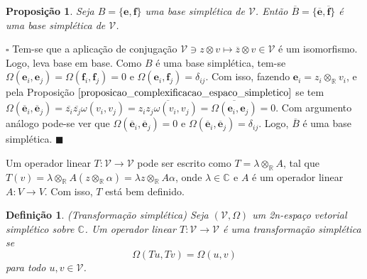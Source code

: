\documentclass[12pt]{book}
\newtheorem{definicao}[teorema]{Definição}
\newtheorem{proposicao}[teorema]{Proposição}
\newenvironment{prova}[1]{$\square$ #1}{\hfill$\blacksquare$}
\newcommand{\complexificado}[1]{\mathcal{#1}}
\newcommand{\complexificacaoelemento}[2]{#1\otimes_{\reta} #2}
\newcommand{\complexo}[1]{\mathbb{C}^{#1}}
\newcommand{\formaSimpletica}[2]{\omega(#1, #2)}
\newcommand{\formaSimpleticaExtendida}[2]{\Omega(#1, #2)}
\newcommand{\real}[1]{\mathbb{R}^{#1}}
\newcommand{\reta}{\real{}}
\begin{document}
	\begin{proposicao}\label{proposicao_base_simpletica_conjugada}
		Seja $B=\{\textbf{e}, \textbf{f} \}$ uma base simplética de $\complexificado{V}$. Então $\overline{B}=\{\overline{\textbf{e}}, \overline{\textbf{f}}\}$ é uma base simplética de $\complexificado{V}$.
	\end{proposicao}
	\begin{prova}
		Tem-se que a aplicação de conjugação $\complexificado{V} \ni z\otimes v \mapsto \overline{z}\otimes v \in \complexificado{V}$ é um isomorfismo. Logo, leva base em base. Como $B$ é uma base simplética, tem-se $\Omega(\textbf{e}_{i}, \textbf{e}_{j}) = \Omega(\textbf{f}_{i}, \textbf{f}_{j}) =0$ e $\Omega(\textbf{e}_{i}, \textbf{f}_{j}) = \delta_{ij}$. Com isso, fazendo $\textbf{e}_{i} = \complexificacaoelemento{z_{i}}{v_{i}}$, e pela Proposição $\ref{proposicao_complexificacao_espaco_simpletico}$ se tem $\Omega(\overline{\textbf{e}}_{i}, \overline{\textbf{e}}_{j}) =	\overline{z_{i}}\overline{z_{j}}\formaSimpletica{v_{i}}{v_{j}}=\overline{z_{i}z_{j}\formaSimpletica{v_{i}}{v_{j}}} = \overline{\Omega(\textbf{e}_{i}, \textbf{e}_{j})} = 0$. Com argumento análogo pode-se ver que $\Omega(\overline{\textbf{e}}_{i}, \overline{\textbf{e}}_{j}) =0$ e $\Omega(\overline{\textbf{e}}_{i}, \overline{\textbf{e}}_{j}) =\delta_{ij}$. Logo, $\overline{B}$ é uma base simplética.
	\end{prova}
	
	Um operador linear $T : \complexificado{V} \to \complexificado{V}$ pode ser escrito como $T=\complexificacaoelemento{\lambda}{A}$, tal que $T(v) = \complexificacaoelemento{\lambda}{A}(\complexificacaoelemento{z}{\alpha}) = \complexificacaoelemento{\lambda z}{A\alpha}$, onde $\lambda \in \complexo{}$ e $A$ é um operador linear $A:V \to V$. Com isso, $T$ está bem definido.
	
	\begin{definicao}
		(Transformação simplética) Seja $(\complexificado{V}, \Omega)$ um 2n-espaço vetorial simplético sobre $\complexo{}$. Um operador linear $T: \complexificado{V} \to \complexificado{V}$ é uma transformação simplética se 
		$$
		\formaSimpleticaExtendida{Tu}{Tv} = \formaSimpleticaExtendida{u}{v}
		$$ para todo $u,v\in \complexificado{V}$.
	\end{definicao}
	
\end{document}
